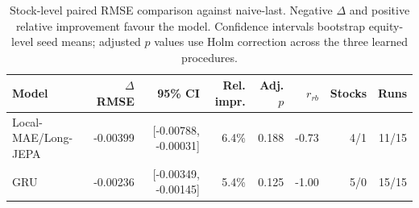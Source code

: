 \begin{table}[t]
\centering
\small
\caption{Stock-level paired RMSE comparison against naive-last. Negative $\Delta$ and positive relative improvement favour the model. Confidence intervals bootstrap equity-level seed means; adjusted $p$ values use Holm correction across the three learned procedures.}
\label{tab:paired_rmse_naive}
\begin{tabular}{lrrrrrrr}
\toprule
Model & $\Delta$RMSE & 95\% CI & Rel. impr. & Adj. $p$ & $r_{rb}$ & Stocks & Runs \\
\midrule
Local-MAE/Long-JEPA & -0.00399 & [-0.00788, -0.00031] & 6.4\% & 0.188 & -0.73 & 4/1 & 11/15 \\
GRU & -0.00236 & [-0.00349, -0.00145] & 5.4\% & 0.125 & -1.00 & 5/0 & 15/15 \\
\bottomrule
\end{tabular}
\end{table}
